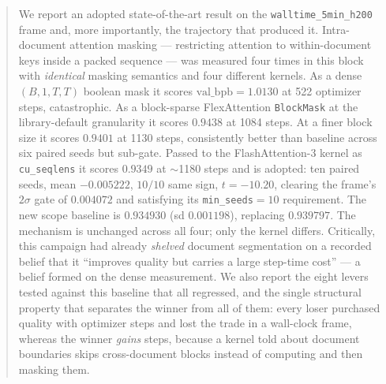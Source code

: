 \documentclass{article}
\newcommand{\valbpb}{\mathrm{val\_bpb}}
\begin{document}
\printAffiliationsAndNotice{}

\begin{abstract}
We report an adopted state-of-the-art result on the \texttt{walltime\_5min\_h200} frame and, more importantly, the trajectory that produced it. Intra-document attention masking --- restricting attention to within-document keys inside a packed sequence --- was measured four times in this block with \emph{identical} masking semantics and four different kernels. As a dense $(B,1,T,T)$ boolean mask it scores $\valbpb = 1.0130$ at 522 optimizer steps, catastrophic. As a block-sparse FlexAttention \texttt{BlockMask} at the library-default granularity it scores $0.9438$ at 1084 steps. At a finer block size it scores $0.9401$ at 1130 steps, consistently better than baseline across six paired seeds but sub-gate. Passed to the FlashAttention-3 kernel as \texttt{cu\_seqlens} it scores $0.9349$ at $\sim$1180 steps and is adopted: ten paired seeds, mean $-0.005222$, $10/10$ same sign, $t = -10.20$, clearing the frame's $2\sigma$ gate of $0.004072$ and satisfying its \texttt{min\_seeds}$=10$ requirement. The new scope baseline is $0.934930$ (sd $0.001198$), replacing $0.939797$. The mechanism is unchanged across all four; only the kernel differs. Critically, this campaign had already \emph{shelved} document segmentation on a recorded belief that it ``improves quality but carries a large step-time cost'' --- a belief formed on the dense measurement. We also report the eight levers tested against this baseline that all regressed, and the single structural property that separates the winner from all of them: every loser purchased quality with optimizer steps and lost the trade in a wall-clock frame, whereas the winner \emph{gains} steps, because a kernel told about document boundaries skips cross-document blocks instead of computing and then masking them.
\end{abstract}
\end{document}
